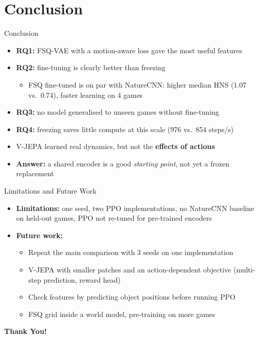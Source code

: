 \documentclass[aspectratio=43,10pt]{beamer}
\begin{document}
\section{Conclusion}

\begin{frame}{Conclusion}
  \begin{itemize}\setlength\itemsep{0.55em}
    \item \textbf{RQ1:} FSQ-VAE with a motion-aware loss gave the most useful features
    \item \textbf{RQ2:} fine-tuning is clearly better than freezing
      \begin{itemize}
        \item FSQ fine-tuned is on par with NatureCNN: higher median HNS (1.07 vs.\ 0.74),
              faster learning on 4 games
      \end{itemize}
    \item \textbf{RQ3:} no model generalised to unseen games without fine-tuning
    \item \textbf{RQ4:} freezing saves little compute at this scale (976 vs.\ 854 steps/s)
    \item V-JEPA learned real dynamics, but not the \textbf{effects of actions}
    \item \textbf{Answer:} a shared encoder is a good \emph{starting point}, not yet a frozen
          replacement
  \end{itemize}
\end{frame}

\begin{frame}{Limitations and Future Work}
  \begin{itemize}\setlength\itemsep{0.55em}
    \item \textbf{Limitations:} one seed, two PPO implementations, no NatureCNN baseline on
          held-out games, PPO not re-tuned for pre-trained encoders
    \item \textbf{Future work:}
      \begin{itemize}\setlength\itemsep{0.3em}
        \item Repeat the main comparison with 3 seeds on one implementation
        \item V-JEPA with smaller patches and an action-dependent objective
              (multi-step prediction, reward head)
        \item Check features by predicting object positions before running PPO
        \item FSQ grid inside a world model, pre-training on more games
      \end{itemize}
  \end{itemize}
\end{frame}

\begin{frame}
  \vfill
  \centering
  {\Huge\bfseries Thank You!}
  \vfill
\end{frame}
\end{document}
